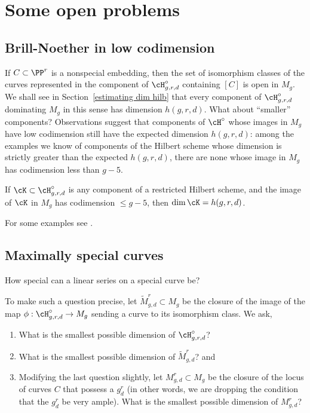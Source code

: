 \section{Some open problems}\label{open problems}

\subsection{Brill-Noether in low codimension}
 
If $C\subset \PP^r$ is a nonspecial embedding, then the set of isomorphism classes of the curves represented
in the component of $\cH^\circ_{g,r,d}$ containing $[C]$ is open in $M_g$. We shall see in Section~\ref{estimating dim hilb} that every component of $\cH^\circ_{g,r,d}$  dominating $M_g$ in this sense has dimension $h(g,r,d)$. 
What about ``smaller'' components?
Observations suggest that components of $\cH^\circ$ whose images in $M_g$ have low codimension still have the expected dimension $h(g,r,d)$: among the examples we know of components of the Hilbert scheme whose dimension is strictly greater than the expected $h(g,r,d)$, there are none whose image in $M_g$ has codimension less than $g-5$. 

\begin{conjecture}\label{large rho hilb dimension}
If $\cK \subset \cH^\circ_{g,r,d}$ is any component of a restricted Hilbert scheme, and the image of $\cK$ in $M_g$ has codimension $\leq g-5$, then $\dim \cK = h(g,r,d)$.
\end{conjecture}

For some examples see \cite[Theorem 3.4]{MR1221726}.


\subsection{Maximally special  curves} 
How special can a linear series on a special curve be?

To make such a question precise, let $\widetilde M^r_{g,d} \subset M_g$ be the closure of the image of the map $\phi : \cH^\circ_{g,r,d}\to M_g$ sending a curve to its isomorphism class. We ask,
\begin{enumerate}
\item What is the smallest possible dimension of $\cH^\circ_{g,r,d}$? 
\item What is the smallest possible dimension of $\widetilde M^r_{g,d}$? and
\item Modifying the last question slightly, let $M^r_{g,d} \subset M_g$ be the closure of the locus of curves $C$ that possess a $g^r_d$ (in other words, we are dropping the condition that the $g^r_d$ be very ample). What is the smallest possible dimension of $M^r_{g,d}$?
\end{enumerate}

